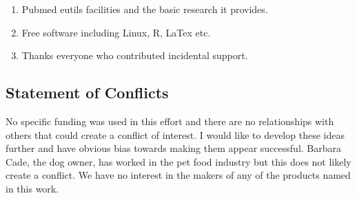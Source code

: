 \begin{acknowledgments} 

% 
\begin{enumerate}
\item Pubmed eutils facilities and the basic research it provides. 
\item Free software including Linux, R, LaTex  etc.
\item Thanks everyone who contributed incidental support. 
\end{enumerate}

\end{acknowledgments}

\clearpage
\appendix

\begin{mdpicomment}

\section{ Statement of Conflicts }
 No specific funding was used in this effort and there are no relationships
with others that could create a conflict of interest. I would like to develop
these ideas further and have obvious bias towards making them appear 
successful. Barbara Cade, the dog owner, has worked in the pet food industry
but this does not likely create a conflict. We have no interest in the
makers of any of the products named in this work.  

\end{mdpicomment}

